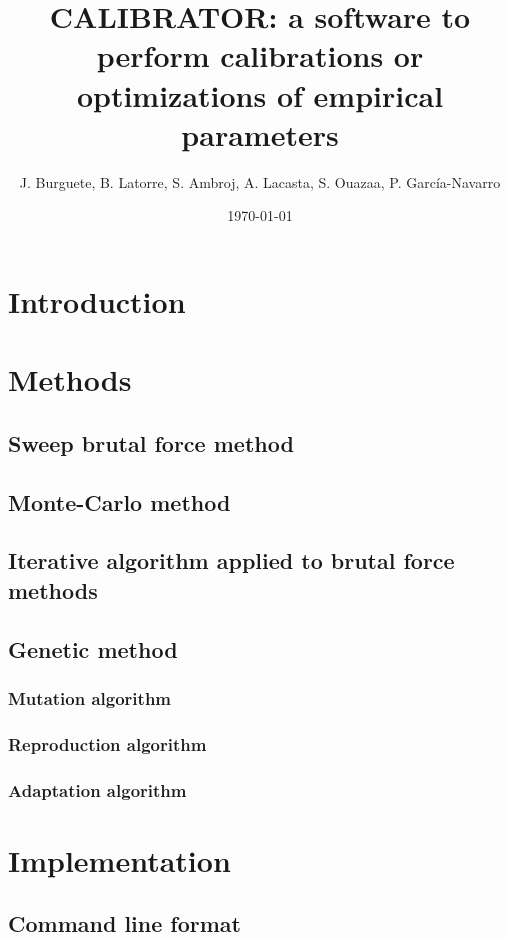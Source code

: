 \documentclass{article}
\title{CALIBRATOR: a software to perform calibrations or optimizations of
empirical parameters}
\author{J. Burguete, B. Latorre, S. Ambroj, A. Lacasta, S. Ouazaa,
P. García-Navarro}
\date{\today}
\begin{document}
\maketitle

\section{Introduction}

\section{Methods}

\subsection{Sweep brutal force method}

\subsection{Monte-Carlo method}

\subsection{Iterative algorithm applied to brutal force methods}

\subsection{Genetic method}

\subsubsection{Mutation algorithm}

\subsubsection{Reproduction algorithm}

\subsubsection{Adaptation algorithm}

\section{Implementation}

\subsection{Command line format}
\end{document}
